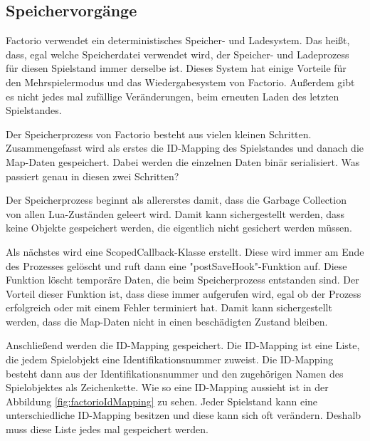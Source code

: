 \subsection{Speichervorgänge}
Factorio verwendet ein deterministisches Speicher- und Ladesystem. Das heißt, dass, egal welche Speicherdatei verwendet wird, der Speicher- und Ladeprozess für diesen Spielstand immer derselbe ist. Dieses System hat einige Vorteile für den Mehrspielermodus und das Wiedergabesystem von Factorio. Außerdem gibt es nicht jedes mal zufällige Veränderungen, beim erneuten Laden des letzten Spielstandes.\cite{factorioGithubSaveLoad}

Der Speicherprozess von Factorio besteht aus vielen kleinen Schritten. Zusammengefasst wird als erstes die ID-Mapping des Spielstandes und danach die Map-Daten gespeichert.
\cite{factorioFridayFacts270} Dabei werden die einzelnen Daten binär serialisiert.\cite{factorioGithubSaveLoad} Was passiert genau in diesen zwei Schritten? 

Der Speicherprozess beginnt als allererstes damit, dass die Garbage Collection von allen Lua-Zuständen geleert wird. Damit kann sichergestellt werden, dass keine Objekte gespeichert werden, die eigentlich nicht gesichert werden müssen.\cite{factorioGithubSaveLoad}

Als nächstes wird eine ScopedCallback-Klasse erstellt. Diese wird immer am Ende des Prozesses gelöscht und ruft dann eine "postSaveHook"-Funktion auf. Diese Funktion löscht temporäre Daten, die beim Speicherprozess entstanden sind. Der Vorteil dieser Funktion ist, dass diese immer aufgerufen wird, egal ob der Prozess erfolgreich oder mit einem Fehler terminiert hat. Damit kann sichergestellt werden, dass die Map-Daten nicht in einen beschädigten Zustand bleiben.\cite{factorioGithubSaveLoad}

Anschließend werden die ID-Mapping gespeichert.\cite{factorioGithubSaveLoad} Die ID-Mapping ist eine Liste, die jedem Spielobjekt eine Identifikationsnummer zuweist. Die ID-Mapping besteht dann aus der Identifikationsnummer und den zugehörigen Namen des Spielobjektes als Zeichenkette. Wie so eine ID-Mapping aussieht ist in der Abbildung \ref{fig:factorioIdMapping} zu sehen. Jeder Spielstand kann eine unterschiedliche ID-Mapping besitzen und diese kann sich oft verändern. Deshalb muss diese Liste jedes mal gespeichert werden.\cite{factorioFridayFacts259}

